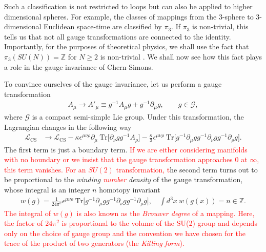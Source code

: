     Such a classification is not restricted to loops but can also be applied to higher dimensional spheres. For example, the classes of mappings from the 3-sphere to 3-dimensional Euclidean space-time are classified by $\pi_3$. If $\pi_3$ is non-trivial, this tells us that not all gauge transformations are connected to the identity. Importantly, for the purposes of theoretical physics, we shall use the fact that $\pi_3\left(SU(N) \right)=\mathbb{Z}$ for $N\geq2$ is non-trivial \cite{Toda1959}. We shall now see how this fact plays a role in the gauge invariance of Chern-Simons.

    To convince ourselves of the gauge invariance, let us perform a gauge transformation
    \begin{align}
        A_{\mu} \rightarrow A'_{\mu} \equiv g^{-1} A_{\mu} g + g^{-1}\partial_{\mu} g, \qquad g\in \mathcal{G},
    \end{align}
    where $\mathcal{G}$ is a compact semi-simple Lie group.
    Under this transformation, the Lagrangian changes in the following way
    \begin{align}
        \mathcal{L}_{\text{CS}} &\rightarrow \mathcal{L}_{\text{CS}}  - \kappa \epsilon^{\mu \nu \rho} \partial_{\mu} \ \mathrm{Tr} \bigg[\partial_{\nu} g g^{-1} A_{\rho}  \bigg] - \frac{\kappa}{3} \epsilon^{\mu \nu \rho} \ \mathrm{Tr} \bigg[g^{-1} \partial_{\mu} g g^{-1} \partial_{\nu} g g^{-1} \partial_{\rho} g\bigg].
    \end{align}
    The first term is just a boundary term. \textcolor{red}{If we are either considering manifolds with no boundary or we insist that the gauge transformation approaches $0$ at $\infty$, this term vanishes.} \textcolor{red}{For an $SU(2)$ transformation, t}he second term turns out to be proportional to the \textit{winding \textcolor{red}{number} density} of the gauge transformation, whose integral is an integer $n$ homotopy invariant
    \begin{align}
        w(g) = \frac{1}{24 \pi^2} \epsilon^{\mu \nu \rho} \ \mathrm{Tr} \bigg[g^{-1}\partial_{\mu} g g^{-1} \partial_{\nu} g g^{-1} \partial_{\rho} g \bigg], \quad \int d^3x \ w(g(x)) = n \in \mathbb{Z}.
    \end{align}
    \textcolor{red}{The integral of $w(g)$ is also known as the \textit{Brouwer degree} of a mapping. Here, the factor of $24\pi^2$ is proportional to the volume of the SU(2) group and depends only on the choice of gauge group and the convention we have chosen for the trace of the product of two generators (the \textit{Killing form}). }


